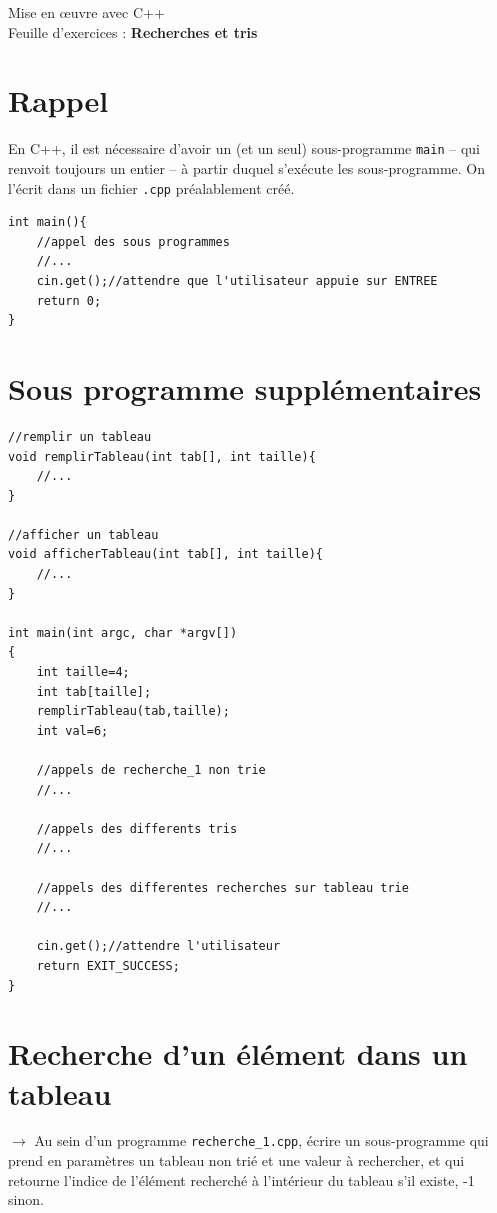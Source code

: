 \documentclass[french]{article}
\begin{document}
	
	\begin{minipage}{\textwidth}
\begin{center}

{\Large Mise en œuvre avec C++ \\ Feuille d'exercices : \textbf{Recherches et tris}}
\end{center}
	\end{minipage}
		
\section*{Rappel}
En C++, il est nécessaire d'avoir un (et un seul) sous-programme \texttt{main} -- qui renvoit toujours un entier -- à partir duquel s'exécute les sous-programme. On l'écrit dans un fichier \texttt{.cpp} préalablement créé.
\begin{lstlisting}[caption={Exemple de main dans recherche1.cpp}]
int main(){
    //appel des sous programmes
    //...
    cin.get();//attendre que l'utilisateur appuie sur ENTREE
    return 0;
}    
\end{lstlisting}

\section*{Sous programme supplémentaires}
	\begin{lstlisting}[caption={Sous programmes supplémentaires}]
//remplir un tableau
void remplirTableau(int tab[], int taille){
    //...
}

//afficher un tableau
void afficherTableau(int tab[], int taille){
    //...
}

int main(int argc, char *argv[])
{
    int taille=4;
    int tab[taille];
    remplirTableau(tab,taille);
    int val=6;
    
    //appels de recherche_1 non trie 
    //...
    
    //appels des differents tris
    //...
    
    //appels des differentes recherches sur tableau trie
    //...
    
    cin.get();//attendre l'utilisateur
    return EXIT_SUCCESS;
}
\end{lstlisting}
\section{Recherche d'un élément dans un tableau}

	$\rightarrow$ Au sein d’un programme \texttt{recherche\_1.cpp}, écrire un sous-programme qui prend en paramètres un tableau non trié et une valeur à rechercher, et qui retourne l’indice de l’élément recherché à l’intérieur du tableau s’il existe, -1 sinon.
	
\end{document}
